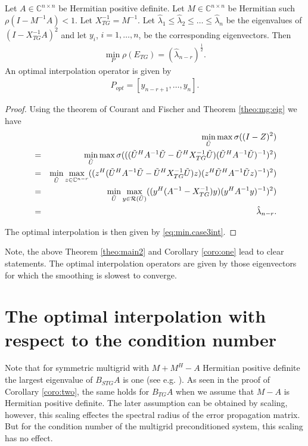 \documentclass[final]{amsart}
\newcommand{\beqo}{\begin{eqnarray*}}
\newcommand{\beq}{\begin{eqnarray}}
\newcommand{\eeqo}{\end{eqnarray*}}
\newcommand{\eeq}{\end{eqnarray}}
\numberwithin{equation}{section}
\newcommand{\ran} {{\cal R}}
\newcommand{\bC}{\mathbb{C}}
\newcommand{\inCnn}{\in \mathbb{C}^{n \times n}}
\begin{document}
{\begin{theorem} \label{theo:main2}
Let  $A\inCnn$  be Hermitian positive definite. Let $ M \inCnn$ be Hermitian
such $\rho(I - M^{-1}A) < 1$.
Let $X_{TG}^{-1} =  M^{-1}$.   
 Let $
\hat \lambda_1 \leq \hat \lambda_2 \leq \ldots \leq  \hat \lambda_n $
be the  eigenvalues of $(I - X_{TG}^{-1}A)^2$  and let $y_i$, $i = 1, \ldots,
n$, be the corresponding eigenvectors. Then
\beq \label{eq:min.case3}
\min_{P}\rho(E_{TG}) = (\hat \lambda_{n-r})^{\frac{1}{2}}.
\eeq
An optimal interpolation operator is given by 
\beq  \label{eq:min.case3int}
P_{opt} = [y_{n-r+1}, \ldots , y_n].
\eeq
\end{theorem}
\begin{proof}
Using the theorem of Courant and Fischer and Theorem \ref{theo:mg:eig} we have
\beqo
& & \min_{\tilde U} \max \sigma((I - Z)^2) \\
& = & \min_{\tilde U} \max \sigma( ((\tilde U^HA^{-1}\tilde U - \tilde
U^HX_{TG}^{-1}\tilde U) (\tilde U^HA^{-1}\tilde U)^{-1})^2)\\
& = & \min_{\tilde U} \max_{z \in \bC ^{n-r}}  ((z^H(\tilde U^HA^{-1}\tilde U -
\tilde U^HX_{TG}^{-1}\tilde U)z) (z^H\tilde U^HA^{-1}\tilde Uz)^{-1})^2)\\
& = & \min_{\tilde U} \max_{y \in \ran (\tilde U)}  ((y^H(A^{-1} -
X_{TG}^{-1})y) (y^HA^{-1}y)^{-1})^2)\\
& = & \hat \lambda_{n-r}.
\eeqo
  
The optimal interpolation is then given by \eqref{eq:min.case3int}.
\end{proof}


Note, the above Theorem \ref{theo:main2} and  Corollary \ref{coro:one} lead to
clear statements. The optimal interpolation operators are given by those
eigenvectors for which the smoothing is slowest to converge.







\section{The optimal interpolation with respect to the  condition number}





Note  that for symmetric multigrid with  $M + M^H - A$ Hermitian  positive
definite  the largest eigenvalue of
$B_{STG}A$ is one (see e.g. \cite{Not15}).  As seen in the proof of Corollary
\ref{coro:two}, the same holds  for  $B_{TG}A$ when we assume  that  $M - A$ is
Hermitian  positive definite. The later
assumption can be obtained  by scaling, however, this scaling effectes the
spectral radius of the
error propagation matrix. But for the condition number of the multigrid
preconditioned system, this scaling has no effect.

}
\end{document}
